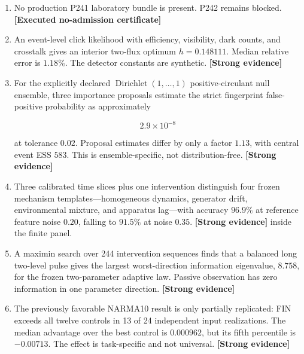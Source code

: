 \documentclass[11pt,a4paper,openany]{report}
\newcommand{\statusStrong}{\textcolor{finblue}{[Strong evidence]}}
\newcommand{\statusRefuted}{\textcolor{finred}{[Refuted]}}
\begin{document}
\begin{enumerate}
\[
   K_{\rm fc}(d)
   =
   \frac{\alpha_{\rm geo}
   \cos(\pi d/4+\pi/6)}
   {1+\beta_{\rm tors}d^{D_f}},
   \qquad D_f=\alpha_{\rm geo}=4\ln2,
   \]

has minimum mean-zero eigenvalue \(-17.328\). It fails before strict spectral matching. \textbf{\statusRefuted{}} as a sufficient completion atom.

\item 
No production P241 laboratory bundle is present. P242 remains blocked. \textbf{[Executed no-admission certificate]}

\item 
An event-level click likelihood with efficiency, visibility, dark counts, and crosstalk gives an interior two-flux optimum \(h=0.148111\). Median relative error is \(1.18\%\). The detector constants are synthetic. \textbf{\statusStrong{}}

\item 
For the explicitly declared \(\operatorname{Dirichlet}(1,\ldots,1)\) positive-circulant null ensemble, three importance proposals estimate the strict fingerprint false-positive probability as approximately

\[
   2.9\times10^{-8}
   \]

at tolerance \(0.02\). Proposal estimates differ by only a factor \(1.13\), with central event ESS \(583\). This is ensemble-specific, not distribution-free. \textbf{\statusStrong{}}

\item 
Three calibrated time slices plus one intervention distinguish four frozen mechanism templates---homogeneous dynamics, generator drift, environmental mixture, and apparatus lag---with accuracy \(96.9\%\) at reference feature noise \(0.20\), falling to \(91.5\%\) at noise \(0.35\). \textbf{[Strong evidence]} inside the finite panel.

\item 
A maximin search over 244 intervention sequences finds that a balanced long two-level pulse gives the largest worst-direction information eigenvalue, \(8.758\), for the frozen two-parameter adaptive law. Passive observation has zero information in one parameter direction. \textbf{[Strong evidence]}

\item 
The previously favorable NARMA10 result is only partially replicated: FIN exceeds all twelve controls in 13 of 24 independent input realizations. The median advantage over the best control is \(0.000962\), but its fifth percentile is \(-0.00713\). The effect is task-specific and not universal. \textbf{\statusStrong{}}


\end{enumerate}
\end{document}
